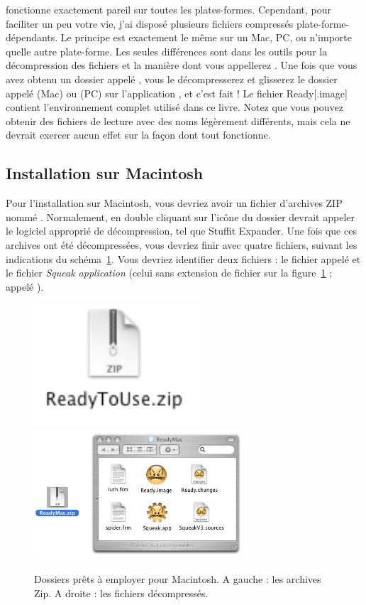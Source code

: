\documentclass[a4paper,10pt,twoside]{book}
\begin{document}
\Squeak fonctionne exactement pareil sur toutes les plates-formes. Cependant, pour faciliter un peu votre vie, j'ai dispos\'e plusieurs fichiers compress\'es plate-forme-d\'ependants. Le principe est exactement le m\^eme sur un Mac, PC, ou n'importe quelle autre plate-forme. Les seules diff\'erences sont dans les outils pour la d\'ecompression des fichiers et la mani\`ere dont vous appellerez \Squeak. Une fois que vous avez obtenu un dossier appel\'e , vous le d\'ecompresserez et glisserez le dossier appel\'e  (Mac) ou  (PC) sur l'application \Squeak, et c'est fait ! Le fichier Ready[.image] contient l'environnement complet utilis\'e dans ce livre. Notez que vous pouvez obtenir des fichiers de lecture avec des noms l\'eg\`erement diff\'erents, mais cela ne devrait exercer aucun effet sur la fa\c con dont tout fonctionne.

\subsection{Installation sur Macintosh}

Pour l'installation sur Macintosh, vous devriez avoir un fichier d'archives ZIP nomm\'e . Normalement, en double cliquant sur l'ic\^one du dossier devrait appeler le logiciel appropri\'e de d\'ecompression, tel que Stuffit Expander. Une fois que ces archives ont \'et\'e d\'ecompress\'ees, vous devriez finir avec quatre fichiers, suivant les indications du sch\'ema~\ref{fig:macfiles}. Vous devriez identifier deux fichiers : le fichier appel\'e  et le fichier \emph{Squeak application} (celui sans extension de fichier sur la figure~\ref{fig:macfiles} ; appel\'e \Squeak).

\begin{figure}[h]\centerline{\includegraphics{1-ReadyToUseMacZip2}\includegraphics[width=8cm]{2-macFiles2}}
\caption{Dossiers pr\^ets \`a employer pour Macintosh. A gauche : les archives Zip. A droite : les fichiers d\'ecompress\'es.\label{fig:macfiles}}\end{figure}
\end{document}
